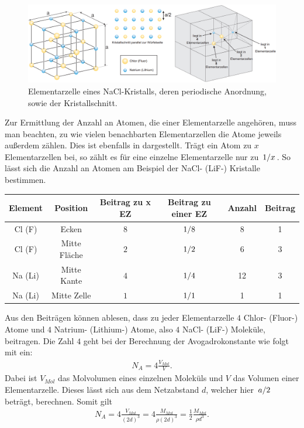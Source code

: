 \begin{figure}[H]
  \centering
  \includegraphics[width=\textwidth]{files/elementarzelle_nacl_reordered.png}
  \caption{Elementarzelle eines NaCl-Kristalls, deren periodische Anordnung, sowie der Kristallschnitt.}
  \label{fig:elementarzelle_nacl_reordered}
\end{figure}

Zur Ermittlung der Anzahl an Atomen, die einer Elementarzelle angehören, muss man beachten, zu wie vielen benachbarten Elementarzellen die Atome jeweils außerdem zählen. Dies ist ebenfalls in  dargestellt. Trägt ein Atom zu $x$ Elementarzellen bei, so zählt es für eine einzelne Elementarzelle nur zu $\flatfrac{1}{x}$. So lässt sich die Anzahl an Atomen am Beispiel der NaCl- (LiF-) Kristalle bestimmen.

\begin{table}[H]
  \centering
  \begin{tabular}{c|c|c|c||c|c}
    Element & Position & Beitrag zu x EZ & Beitrag zu einer EZ & Anzahl & Beitrag\\\hline
    Cl (F) & Ecken & $8$ & $\flatfrac{1}{8}$ & 8 & 1\\
    Cl (F) & Mitte Fläche & $2$ & $\flatfrac{1}{2}$ & 6 & 3\\
    Na (Li) & Mitte Kante & $4$ & $\flatfrac{1}{4}$ & 12 & 3\\
    Na (Li) & Mitte Zelle & $1$ & $\flatfrac{1}{1}$ & 1 & 1\\
  \end{tabular}
\end{table}

Aus den Beiträgen können ablesen, dass zu jeder Elementarzelle $4$ Chlor- (Fluor-) Atome und $4$ Natrium- (Lithium-) Atome, also $4$ NaCl- (LiF-) Moleküle, beitragen. Die Zahl $4$ geht bei der Berechnung der Avogadrokonstante wie folgt mit ein:
\begin{align}
  N_{A} = 4 \frac{V_{Mol}}{V}.
\end{align}
Dabei ist $V_{Mol}$ das Molvolumen eines einzelnen Moleküls und $V$ das Volumen einer Elementarzelle. Dieses lässt sich aus dem Netzabstand $d$, welcher hier $\flatfrac{a}{2}$ beträgt, berechnen. Somit gilt
\begin{align}
  N_A = 4 \frac{V_{Mol}}{(2d)^3} = 4 \frac{M_{Mol}}{\rho (2d)^3} = \frac{1}{2}\frac{M_{Mol}}{\rho d^3}.
\end{align}


